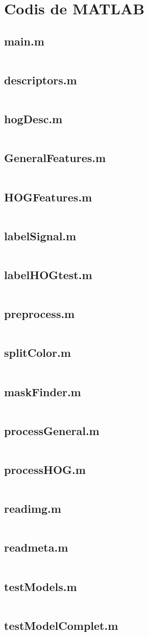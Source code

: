 
\section{Codis de MATLAB}

\newcommand{\inmat}[1]{
    \subsection{#1}%
    \inputminted{matlab}{./code/#1}
    \pagebreak
}

\inmat{main.m}

\inmat{descriptors.m}
\inmat{hogDesc.m}

\inmat{GeneralFeatures.m}
\inmat{HOGFeatures.m}

\inmat{labelSignal.m}
\inmat{labelHOGtest.m}

\inmat{preprocess.m}
\inmat{splitColor.m}
\inmat{maskFinder.m}

\inmat{processGeneral.m}
\inmat{processHOG.m}

\inmat{readimg.m}
\inmat{readmeta.m}

\inmat{testModels.m}
\inmat{testModelComplet.m}
